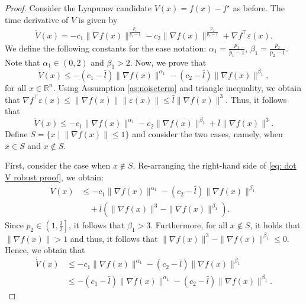\documentclass[letterpaper]{article}
\begin{document}
\begin{proof}
Consider the Lyapunov candidate $V(x)=f(x)-f^\star$ as before. The time derivative of $V$ is given by 
\begin{align*}
\dot{V}(x) = -c_1\|\nabla f(x)\|^{\frac{p_1}{p_1-1}}-c_2\|\nabla f(x)\|^{\frac{p_2}{p_2-1}}+\nabla f^\intercal \varepsilon(x). 
\end{align*} 
We define the following constants for the ease notation: $\alpha_1= \frac{p_1}{p_1 -1}$, $\beta_1= \frac{p_2}{p_2 -1}$. Note that $\alpha_1 \in (0,2)$ and $\beta_1 >2$. 
Now, we prove that 
\begin{equation} \label{eq:robust_bound}
\dot{V}(x)\leq -(c_1 -\bar{l})\|\nabla f(x)\|^{\alpha_1} -(c_2 -\bar{l})\|\nabla f(x)\|^{\beta_1},
\end{equation}
for all $x\in \mathbb{R}^n$. 
Using Assumption \ref{as:noiseterm} and triangle inequality, we obtain that $\nabla f^\intercal \varepsilon(x)\leq \|\nabla f(x)\|\|\varepsilon(x)\|\leq \bar{l}\|\nabla f(x)\|^3$. Thus, it follows that
\begin{equation}\label{eq: dot V robust proof}
\dot{V}(x) \leq -c_1 \|\nabla f(x)\|^{\alpha_1} -c_2\|\nabla f(x)\|^{\beta_1} +\bar{l}\|\nabla f(x)\|^3.
\end{equation}
Define $S = \{x\; |\; \|\nabla f(x)\|\leq 1\}$ and consider the two cases, namely, when $x\in S$ and $x\notin S$. 

First, consider the case when $x\notin S$. Re-arranging the right-hand side of \eqref{eq: dot V robust proof}, we obtain: 
\begin{align*}
\dot{V}(x) &\leq -c_1\|\nabla f(x)\|^{\alpha_1} -(c_2-\bar{l})\|\nabla f(x)\|^{\beta_1} \\ &\quad +\bar{l}\left(\|\nabla f(x)\|^3 -\|\nabla f(x)\|^{\beta_1}\right).
\end{align*}
Since $p_2\in \left(1,\frac{3}{2}\right]$, it follows that $\beta_1>3$. Furthermore, for all $x\notin S$, it holds that $\|\nabla f(x)\|>1$ and thus, it follows that $\|\nabla f(x)\|^3 -\|\nabla f(x)\|^{\beta_1}\leq0$. Hence, we obtain that
\begin{align*}
\dot{V}(x) &\leq -c_1\|\nabla f(x)\|^{\alpha_1} -(c_2-\bar{l})\|\nabla f(x)\|^{\beta_1} \\
&\leq -(c_1 -\bar{l})\|\nabla f(x)\|^{\alpha_1} -(c_2-\bar{l})\|\nabla f(x)\|^{\beta_1}.
\end{align*}


\end{proof}
\end{document}
